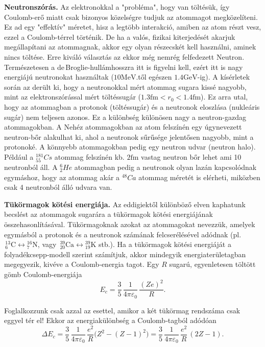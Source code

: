\documentclass[../main.tex]{subfiles}
\begin{document}
\textbf{Neutronszórás.} Az elektronokkal a "probléma", hogy van töltésük, így Coulomb-erő miatt csak bizonyos közelségre tudjuk az atommagot megközelíteni. Ez ad egy "effektív" méretet,
hisz a legtöbb interakció, amiben az atom részt vesz, ezzel a Coulomb-térrel történik. De ha a valós, fizikai kiterjedését akarjuk megállapítani az atommagnak, akkor egy olyan részecskét kell
használni, aminek nincs töltése. Erre kiváló választás az ekkor még nemrég felfedezett Neutron. Természetesen a de\,Broglie-hullámhosszra itt is figyelni kell,
ezért itt is nagy energiájú neutronokat használtak ($10 \text{MeV}$.től egészen $1.4 \text{GeV}$-ig). A kísérletek során az derült ki, hogy a neutronokkal mért atommag sugara
kissé nagyobb, mint az elektronszórással mért töltéssugár ($1.3 \text{fm} < r_0 < 1.4 \text{fm}$). Ez arra utal, hogy az atommagban a protonok (töltéssugár) és a neutronok eloszlása (nukleáris sugár) nem teljesen azonos.
Ez a különbség különösen nagy a neutron-gazdag atommagokban. A Nehéz atommagokban az atom felszínén egy úgynevezett neutron-bőr alakulhat ki, ahol a neutronok sűrűsége jelentősen nagyobb, mint a protonoké.
A könnyebb atommagokban pedig egy neutron udvar (neutron halo). Például a $^{181}_{55}Cs$ atommag felszínén kb. $2 \text{fm}$ vastag neutron bőr lehet ami 10 neutronból áll.
A $^6_2He$ atommagban pedig a neutronok olyan lazán kapcsolódnak egymáshoz, hogy az atommag akár a $^{48}Ca$ atommag méretét is elérheti, miközben csak 4 neutronból álló udvara van.

\textbf{Tükörmagok kötési energiája.} Az eddigiektől különböző elven kaphatunk becslést az atommagok sugarára a tükörmagok kötési energiájának összehasonlításával. Tükörmagoknak azokat az atommagokat nevezzük, amelyek egymásból a protonok és a neutronok számának felcserélésével adódnak (pl. \(\,^{13}_6\mathrm{C}\leftrightarrow{}^{16}_7\mathrm{N}\), vagy \(\,^{39}_{20}\mathrm{Ca}\leftrightarrow{}^{39}_{19}\mathrm{K}\) stb.). Ha a tükörmagok kötési energiáját a folyadékcsepp‑modell szerint számítjuk, akkor mindegyik energiaterületagban megegyezik, kivéve a Coulomb‑energia tagot. Egy \(R\) sugarú, egyenletesen töltött gömb Coulomb‑energiája
\begin{equation}
E_c=\frac{3}{5}\,\frac{1}{4\pi\varepsilon_0}\,\frac{(Ze)^2}{R}.
\tag{1.10}
\end{equation}

Foglalkozzunk csak azzal az esettel, amikor a két tükörmag rendszáma csak eggyel tér el! Ekkor az energiakülönbség a Coulomb‑tagból adódóan
\begin{equation}
\Delta E_c=\frac{3}{5}\,\frac{1}{4\pi\varepsilon_0}\,\frac{e^2}{R}\big(Z^2-(Z-1)^2\big)
=\frac{3}{5}\,\frac{1}{4\pi\varepsilon_0}\,\frac{e^2}{R}\,(2Z-1).
\tag{1.11}
\end{equation}
\end{document}
